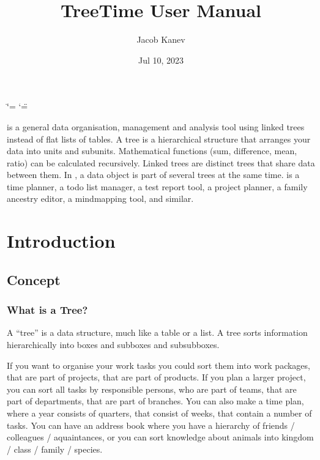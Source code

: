 \documentclass[letterpaper,10pt,english]{sphinxmanual}
\title{TreeTime User Manual}
\date{Jul 10, 2023}
\author{Jacob Kanev}
\begin{document}
\ifdefined\shorthandoff
  \ifnum\catcode`\=\string=\active\shorthandoff{=}\fi
  \ifnum\catcode`\"=\active{}\fi
\fi

\pagestyle{empty}
\sphinxmaketitle
\pagestyle{plain}
\sphinxtableofcontents
\pagestyle{normal}
\label{\detokenize{index::doc}}

\sphinxAtStartPar
{} is a general data organisation, management and analysis tool using linked trees instead of flat lists of tables.
A tree is a hierarchical structure that arranges your data into units and sub\sphinxhyphen{}units.
Mathematical functions (sum, difference, mean, ratio) can be calculated recursively.
Linked trees are distinct trees that share data between them.
In , a data object is part of several trees at the same time.
 is a time planner, a to\sphinxhyphen{}do list manager, a test report tool, a project planner, a family ancestry editor, a mind\sphinxhyphen{}mapping tool, and similar.



\sphinxstepscope


\chapter{Introduction}
\label{\detokenize{introduction:introduction}}\label{\detokenize{introduction::doc}}

\section{Concept}
\label{\detokenize{introduction:concept}}

\subsection{What is a Tree?}
\label{\detokenize{introduction:what-is-a-tree}}
\sphinxAtStartPar
A “tree” is a data structure, much like a table or a list.
A tree sorts information hierarchically into boxes and sub\sphinxhyphen{}boxes and sub\sphinxhyphen{}sub\sphinxhyphen{}boxes.

\sphinxAtStartPar
If you want to organise your work tasks you could sort them into work packages, that are part of projects, that are part of products.
If you plan a larger project, you can sort all tasks by responsible persons, who are part of teams, that are part of departments, that are part of branches.
You can also make a time plan, where a year consists of quarters, that consist of weeks, that contain a number of tasks.
You can have an address book where you have a hierarchy of friends / colleagues / aquaintances, or you can sort knowledge about animals into kingdom / class / family / species.
\end{document}
